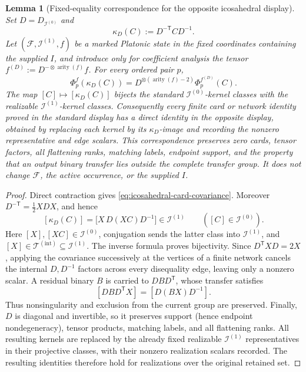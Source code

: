 \documentclass[11pt,letterpaper,onecolumn]{article}
\theoremstyle{plain}
\newtheorem{lemma}[lemma]{Lemma}
\theoremstyle{definition}
\theoremstyle{remark}
\newcommand{\cF}{\mathcal F}
\newcommand{\TetInt}{{\mathcal T^{(\mathrm{int})}}}
\newcommand{\IcoZero}{{\mathcal I^{(0)}}}
\newcommand{\IcoOne}{{\mathcal I^{(1)}}}
\newcommand{\arity}{\operatorname{arity}}
\begin{document}
\begin{lemma}[Fixed-equality correspondence for the opposite icosahedral display]
\label{lem:icosahedral-fixed-I-dictionary}
Set \(D=D_{\IcoZero}\) and
\[
 \kappa_D(C):=D^{-\mathsf T}CD^{-1}.
\]
Let \((\cF,\IcoOne,f)\) be a marked Platonic state in the fixed
coordinates containing the supplied \(I\), and introduce only for
coefficient analysis the tensor
\(f^{(D)}:=D^{-\otimes\arity(f)}f\).  For every ordered pair \(p\),
\begin{equation}
 \Phi_p^f\!\left(\kappa_D(C)\right)
 =D^{\otimes(\arity(f)-2)}\Phi_p^{f^{(D)}}(C).
 \label{eq:icosahedral-card-covariance}
\end{equation}
The map \([C]\mapsto[\kappa_D(C)]\) bijects the standard
\(\IcoZero\)-kernel classes with the realizable \(\IcoOne\)-kernel
classes.  Consequently every finite card or network identity proved in the
standard display has a direct identity in the opposite display, obtained by
replacing each kernel by its \(\kappa_D\)-image and recording the nonzero
representative and edge scalars.  This correspondence preserves zero cards,
tensor factors, all flattening ranks, matching labels, endpoint support,
and the property that an output binary transfer lies outside the complete transfer
group.  It does not change \(\cF\), the active occurrence, or the
supplied \(I\).
\end{lemma}

\begin{proof}
Direct contraction gives \cref{eq:icosahedral-card-covariance}.  Moreover
\(D^{-\mathsf T}=\tfrac12XDX\), and hence
\[
 [\kappa_D(C)]
 =\bigl[X\,D(XC)D^{-1}\bigr]\in\IcoOne
 \qquad([C]\in\IcoZero).
\]
Here \([X],[XC]\in\IcoZero\), conjugation sends the latter class into
\(\IcoOne\), and \([X]\in\TetInt\subseteq\IcoOne\).  The
inverse formula proves bijectivity.  Since \(D^{\mathsf T}XD=2X\), applying
the covariance successively at the vertices of a finite network cancels the
internal \(D,D^{-1}\) factors across every disequality edge, leaving only a nonzero scalar.  A residual binary \(B\) is carried to
\(DBD^{\mathsf T}\), whose transfer satisfies
\[
 [DBD^{\mathsf T}X]=[D(BX)D^{-1}].
\]
Thus nonsingularity and exclusion from the current group are preserved.
Finally, \(D\) is diagonal and invertible, so it preserves support (hence
endpoint nondegeneracy), tensor products, matching labels, and all
flattening ranks.  All resulting kernels are replaced by the already fixed
realizable \(\IcoOne\) representatives in their projective classes, with
their nonzero realization scalars recorded.  The resulting identities therefore hold for realizations over the
original retained set.
\end{proof}
\end{document}
